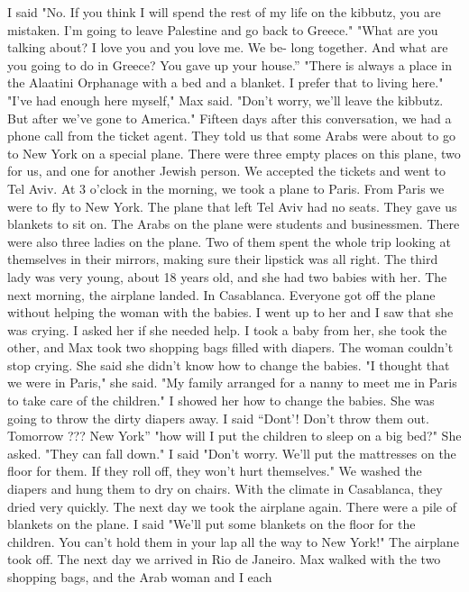 I said "No.
If you think I will spend the rest of my life 
on the kibbutz, you are mistaken.
I'm going to leave Palestine and go 
back to Greece."
"What are you talking about?
I love you and you love me.
We be-
long together.
And what are you going to do in Greece?
You gave up your house.”
"There is always a place in the Alaatini Orphanage with a bed and 
a blanket.
I prefer that to living here."
"I've had enough here myself," Max said.
"Don't worry, we'll leave 
the kibbutz.
But after we've gone to America."
Fifteen days after this conversation, we had a phone call from the 
ticket agent.
They told us that some Arabs were about to go to New 
York on a special plane.
There were three empty places on this plane, 
two for us, and one for another Jewish person.
We accepted the tickets 
and went to Tel Aviv.
At 3 o'clock in the morning, we took a plane to 
Paris.
From Paris we were to fly to New York.
The plane that left Tel 
Aviv had no seats.
They gave us blankets to sit on.
The Arabs on the 
plane were students and businessmen.
There were also three ladies on the 
plane.
Two of them spent the whole trip looking at themselves in their 
mirrors, making sure their lipstick was all right.
The third lady was 
very young, about 18 years old, and she had two babies with her.
The next morning, the airplane landed.
In Casablanca.
Everyone 
got off the plane without helping the woman with the babies.
I went 
up to her and I saw that she was crying.
I asked her if she needed help.
I took a baby from her, she took the other, and Max took two shopping 
bags filled with diapers.
The woman couldn't stop crying.
She said 
she didn't know how to change the babies.
"I thought that we were in Paris," she said.
"My family arranged 
for a nanny to meet me in Paris to take care of the children."
I showed her how to change the babies.
She was going to throw the dirty diapers away.
I said “Dont’!
Don’t throw them out.
Tomorrow ???
New York”
"how will I put the children to sleep on a big bed?"
She asked.
"They can fall down."
I said "Don't worry.
We'll put the mattresses on the floor for 
them.
If they roll off, they won't hurt themselves."
We washed the 
diapers and hung them to dry on chairs.
With the climate in Casablanca, they dried very quickly.
The next day we took the airplane again.
There were a pile of blankets on the plane.
I said "We'll put some blankets on the floor for 
the children.
You can't hold them in your lap all the way to New 
York!"
The airplane took off.
The next day we arrived in Rio de Janeiro.
Max walked with the two shopping bags, and the Arab woman and I each 
